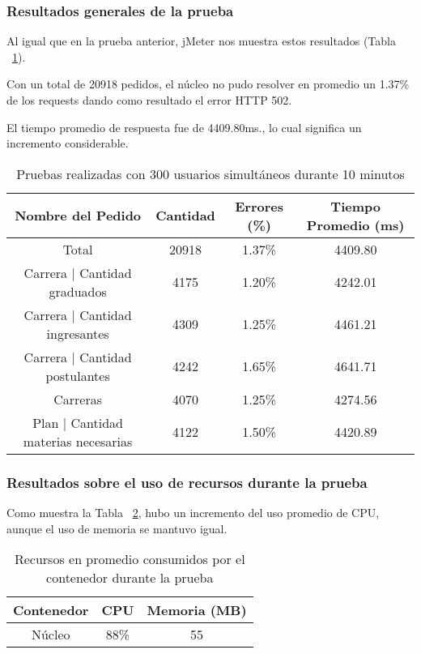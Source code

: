 \subsubsection{Resultados generales de la prueba}

Al igual que en la prueba anterior, jMeter nos muestra estos resultados (Tabla ~\ref{tab:300u_10m_gen}).

Con un total de 20918 pedidos, el núcleo no pudo resolver en promedio un 1.37\% de los requests dando como resultado el error HTTP 502.

El tiempo promedio de respuesta fue de 4409.80ms., lo cual significa un incremento considerable.

\begin{table}[!htbp]
    \centering
    \makegapedcells
    \begin{tabular}{|c|c|c|c|}
    \hline
    Nombre del Pedido & Cantidad & Errores (\%) & Tiempo Promedio (ms) \\ \hline
    Total & 20918 & 1.37\% & 4409.80\\ \hline
    Carrera | Cantidad graduados & 4175 & 1.20\% & 4242.01\\ \hline
    Carrera | Cantidad ingresantes & 4309 & 1.25\% & 4461.21\\ \hline
    Carrera | Cantidad postulantes & 4242 & 1.65\% & 4641.71\\ \hline
    Carreras & 4070 & 1.25\% & 4274.56\\ \hline
    Plan | Cantidad materias necesarias & 4122 & 1.50\% & 4420.89\\ \hline
    \end{tabular}
    \caption{Pruebas realizadas con 300 usuarios simultáneos durante 10 minutos}
    \label{tab:300u_10m_gen}
\end{table}



\subsubsection{Resultados sobre el uso de recursos durante la prueba}

Como muestra la Tabla ~\ref{tab:300u_10m_rec}, hubo un incremento del uso promedio de CPU, aunque el uso de memoria se mantuvo igual.

\begin{table}[!htbp]
    \centering
    \makegapedcells
    \begin{tabular}{|c|c|c|}
    \hline
    Contenedor & CPU & Memoria (MB)\\ \hline
    Núcleo & 88\% & 55 \\ \hline
    \end{tabular}
    \caption{Recursos en promedio consumidos por el contenedor durante la prueba}
    \label{tab:300u_10m_rec}
\end{table}

